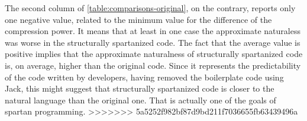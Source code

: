 The second column of \cref{table:comparisons-original}, on the contrary, reports only 
one negative value, related to the minimum value for the difference of the compression power. 
It means that at least in one case the approximate naturaless was worse in the 
structurally spartanized code. The fact that the average value is positive implies
that the approximate naturalness of structurally spartanized
code is, on average, higher than the original code. Since it represents the predictability of
the code written by developers, having removed the boilerplate code using Jack, this
might suggest that structurally spartanized code is closer to the natural language
than the original one. That is actually one of the goals of spartan programming. 
>>>>>>> 5a5252f982bf87d9bd211f7036655fb63439496a




